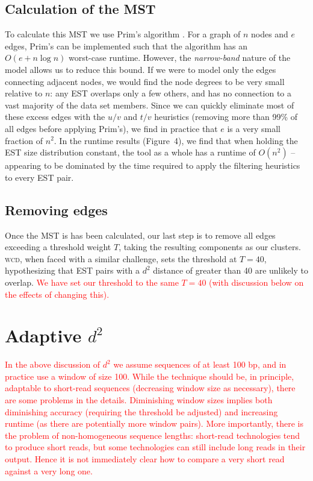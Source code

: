 \documentclass[a4paper,12pt]{article}
\newcommand{\mc}[1]{\textcolor{red}{#1}}
\begin{document}
\begin{appendix}
\subsection{Calculation of the MST}

To calculate this MST we use Prim's algorithm \cite{Prim57}.  For a
graph of $n$ nodes and $e$ edges, Prim's can be implemented such that
the algorithm has an $O(e + n \log n)$ worst-case runtime.  However,
the {\it narrow-band} nature of the model allows us to reduce this
bound.  If we were to model only the edges connecting adjacent nodes,
we would find the node degrees to be very small relative to $n$: any
EST overlaps only a few others, and has no connection to a vast
majority of the data set members.  Since we can quickly eliminate most
of these excess edges with the $u/v$ and $t/v$ heuristics (removing
more than 99\% of all edges before applying Prim's), we find in
practice that $e$ is a very small fraction of $n^2$.  In the
runtime results (Figure~4), we find that when holding the EST size
distribution constant, the tool as a whole has a runtime of $O(n^2)$
-- appearing to be dominated by the time required to apply
the filtering heuristics to every EST pair.

\subsection{Removing edges}

Once the MST is has been calculated, our last step is to remove all
edges exceeding a threshold weight $T$, taking the resulting
components as our clusters.  \textsc{wcd}, when faced with a similar
challenge, sets the threshold at $T=40$, hypothesizing that EST pairs
with a $d^2$ distance of greater than 40 are unlikely to overlap.  \mc{We
have set our threshold to the same $T=40$ (with discussion below on
the effects of changing this).}

\section{Adaptive $d^2$}

\mc{In the above discussion of $d^2$ we assume sequences of at least 100
bp, and in practice use a window of size 100.  While the technique
should be, in principle, adaptable to short-read sequences (decreasing
window size as necessary), there are some problems in the details.
Diminishing window sizes implies both diminishing accuracy (requiring
the threshold be adjusted) and increasing runtime (as there are
potentially more window pairs).  More importantly, there is the
problem of non-homogeneous sequence lengths: short-read technologies
tend to produce short reads, but some technologies can still include
long reads in their output.  Hence it is not immediately clear how to
compare a very short read against a very long one.}


\end{appendix}
\end{document}
